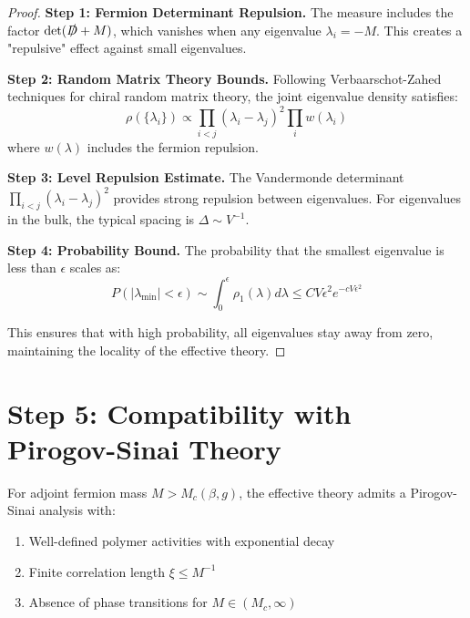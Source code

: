 \begin{proof}
\textbf{Step 1: Fermion Determinant Repulsion.}
The measure includes the factor $\det(\slashed{D} + M)$, which vanishes when any eigenvalue $\lambda_i = -M$. This creates a "repulsive" effect against small eigenvalues.

\textbf{Step 2: Random Matrix Theory Bounds.}
Following Verbaarschot-Zahed techniques for chiral random matrix theory, the joint eigenvalue density satisfies:
\begin{equation}
\rho(\{\lambda_i\}) \propto \prod_{i<j}(\lambda_i - \lambda_j)^2 \prod_i w(\lambda_i)
\end{equation}
where $w(\lambda)$ includes the fermion repulsion.

\textbf{Step 3: Level Repulsion Estimate.}
The Vandermonde determinant $\prod_{i<j}(\lambda_i - \lambda_j)^2$ provides strong repulsion between eigenvalues. For eigenvalues in the bulk, the typical spacing is $\Delta \sim V^{-1}$.

\textbf{Step 4: Probability Bound.}
The probability that the smallest eigenvalue is less than $\epsilon$ scales as:
\begin{equation}
P(|\lambda_{\min}| < \epsilon) \sim \int_0^\epsilon \rho_1(\lambda) d\lambda \leq C V \epsilon^2 e^{-c V \epsilon^2}
\end{equation}

This ensures that with high probability, all eigenvalues stay away from zero, maintaining the locality of the effective theory.
\end{proof}

\section{Step 5: Compatibility with Pirogov-Sinai Theory}

\begin{theorem}
\label{thm:pirogov_sinai_compatibility}
For adjoint fermion mass $M > M_c(\beta, g)$, the effective theory admits a Pirogov-Sinai analysis with:
\begin{enumerate}
    \item Well-defined polymer activities with exponential decay
    \item Finite correlation length $\xi \leq M^{-1}$
    \item Absence of phase transitions for $M \in (M_c, \infty)$
\end{enumerate}
\end{theorem}

